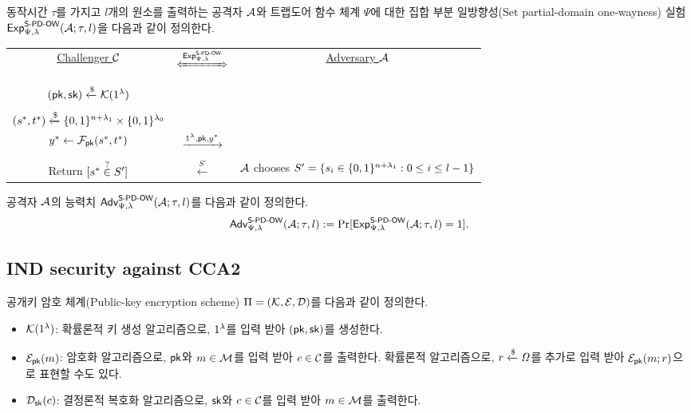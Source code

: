 동작시간 $\tau$를 가지고 $l$개의 원소를 출력하는 공격자 $\mathcal{A}$와 트랩도어 함수
체계 $\Psi$에 대한 집합 부분 일방향성(Set partial-domain one-wayness) 실험
$\textsf{Exp}^{\textsf{S-PD-OW}}_{\Psi, \lambda}(\mathcal{A}; \tau, l)$을 다음과 같이 정의한다.
\begin{tcolorbox}[colback=white]
	\centering
	\begin{tabularx}{\linewidth}{CcC}
		\underline{Challenger $\mathcal{C}$} & $\xLeftrightarrow{\EXP^{\SPDOW}_{\Psi, \lm}}$ & \underline{Adversary $\mathcal{A}$} \\
		\\
		$(\textsf{pk}, \textsf{sk}) \xleftarrow{\$} \mathcal{K}(1^{\lambda})$ & & \\
		\\
		$(s^*, t^*) \xleftarrow{\$} \{0, 1\}^{n + \lambda_1} \times \{0, 1\}^{\lambda_0}$ \\ $y^* \gets \mathcal{F}_{\textsf{pk}}(s^*, t^*)$ & $\xrightarrow{1^{\lambda}, \textsf{pk}, y^*}$ & \\
		\\
		Return $[s^* \overset{?}{\in} S']$ & $\xleftarrow{S'}$ & $\mathcal{A}$ chooses $S' = \{s_i \in \{0, 1\}^{n + \lambda_1}: 0 \le i \le l-1\}$ \\
  \end{tabularx}
\end{tcolorbox}

공격자 $\mathcal{A}$의 능력치 $\textsf{Adv}^{\textsf{S-PD-OW}}_{\Psi, \lambda}(\mathcal{A}; \tau, l)$를 다음과 같이 정의한다.
$$
	\textsf{Adv}^{\textsf{S-PD-OW}}_{\Psi, \lambda}(\mathcal{A}; \tau, l) := \Pr[\textsf{Exp}^{\textsf{S-PD-OW}}_{\Psi, \lambda}(\mathcal{A}; \tau, l) = 1].
$$

\subsection{IND security against CCA2}

공개키 암호
체계(Public-key encryption scheme) $\Pi = (\mathcal{K}, \mathcal{E}, \mathcal{D})$를 다음과 같이
정의한다.
\begin{itemize}
	\item $\mathcal{K}(1^{\lambda})$: 확률론적 키 생성 알고리즘으로, $1^{\lambda}$를 입력 받아
	$(\textsf{pk}, \textsf{sk})$를 생성한다.
	\item $\mathcal{E}_{\textsf{pk}}(m)$: 암호화 알고리즘으로, $\textsf{pk}$와 $m \in \mathcal{M}$를 입력 받아 $c
	\in \mathcal{C}$를 출력한다. 확률론적 알고리즘으로, $r \xleftarrow{\$} \mathit{\Omega}$를 추가로
	입력 받아 $\mathcal{E}_{\textsf{pk}}(m; r)$으로 표현할 수도 있다.
	\item $\mathcal{D}_{\textsf{sk}}(c)$: 결정론적 복호화 알고리즘으로, $\textsf{sk}$와 $c \in \mathcal{C}$를 입력
	받아 $m \in \mathcal{M}$를 출력한다.
\end{itemize}

